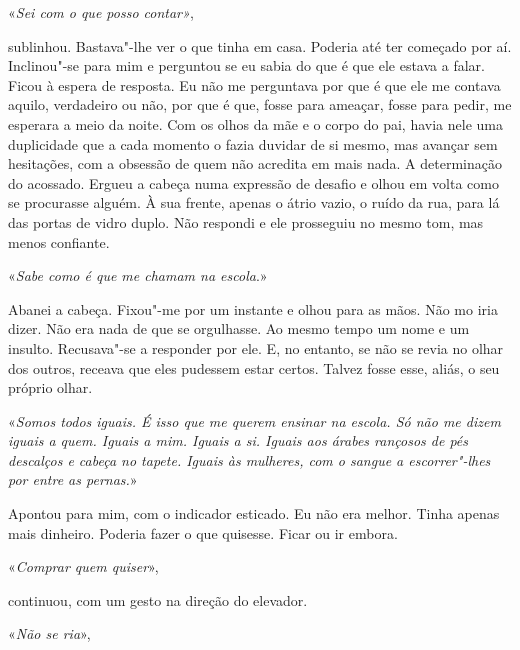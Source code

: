 «\emph{Sei com o que posso contar»},

sublinhou. Bastava"-lhe ver o que tinha em casa. Poderia até ter
começado por aí. Inclinou"-se para mim e perguntou se eu sabia do que é
que ele estava a falar. Ficou à espera de resposta. Eu não me perguntava
por que é que ele me contava aquilo, verdadeiro ou não, por que é que,
fosse para ameaçar, fosse para pedir, me esperara a meio da noite. Com
os olhos da mãe e o corpo do pai, havia nele uma duplicidade que a cada
momento o fazia duvidar de si mesmo, mas avançar sem hesitações, com a
obsessão de quem não acredita em mais nada. A determinação do acossado.
Ergueu a cabeça numa expressão de desafio e olhou em volta como se
procurasse alguém. À sua frente, apenas o átrio vazio, o ruído da rua,
para lá das portas de vidro duplo. Não respondi e ele prosseguiu no
mesmo tom, mas menos confiante.

«\emph{Sabe como é que me chamam na escola}.»

Abanei a cabeça. Fixou"-me por um instante e olhou para as mãos. Não mo
iria dizer. Não era nada de que se orgulhasse. Ao mesmo tempo um nome e
um insulto. Recusava"-se a responder por ele. E, no entanto, se não se
revia no olhar dos outros, receava que eles pudessem estar certos.
Talvez fosse esse, aliás, o seu próprio olhar.

«\emph{Somos todos iguais. É isso que me querem ensinar na escola. Só
não me dizem iguais a quem. Iguais a mim. Iguais a si. Iguais aos árabes
rançosos de pés descalços e cabeça no tapete. Iguais às mulheres, com o
sangue a escorrer"-lhes por entre as pernas.}»

Apontou para mim, com o indicador esticado. Eu não era melhor. Tinha
apenas mais dinheiro. Poderia fazer o que quisesse. Ficar ou ir embora.

«\emph{Comprar quem quiser}»,

continuou, com um gesto na direção do elevador.

«\emph{Não se ria}»,


